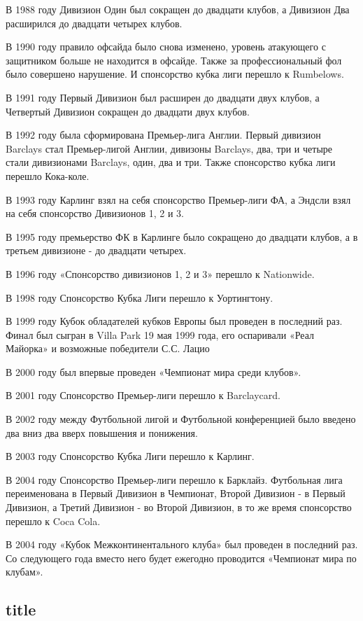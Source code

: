 В 1988 году Дивизион Один был сокращен до двадцати клубов, а Дивизион Два расширился до двадцати четырех клубов.

В 1990 году правило офсайда было снова изменено, уровень атакующего с защитником больше не находится в офсайде. Также за профессиональный фол было совершено нарушение. И спонсорство кубка лиги перешло к Rumbelows.

В 1991 году Первый Дивизион был расширен до двадцати двух клубов, а Четвертый Дивизион сокращен до двадцати двух клубов.

В 1992 году была сформирована Премьер-лига Англии. Первый дивизион Barclays стал Премьер-лигой Англии, дивизоны Barclays, два, три и четыре стали дивизионами Barclays, один, два и три. Также спонсорство кубка лиги перешло Кока-коле.

В 1993 году Карлинг взял на себя спонсорство Премьер-лиги ФА, а Эндсли взял на себя спонсорство Дивизионов 1, 2 и 3.

В 1995 году премьерство ФК в Карлинге было сокращено до двадцати клубов, а в третьем дивизионе - до двадцати четырех.

В 1996 году «Спонсорство дивизионов 1, 2 и 3» перешло к Nationwide.

В 1998 году Спонсорство Кубка Лиги перешло к Уортингтону.

В 1999 году Кубок обладателей кубков Европы был проведен в последний раз. Финал был сыгран в Villa Park 19 мая 1999 года, его оспаривали «Реал Майорка» и возможные победители С.С. Лацио

В 2000 году  был впервые проведен «Чемпионат мира среди клубов».

В 2001 году Спонсорство Премьер-лиги перешло к Barclaycard.

В 2002 году между Футбольной лигой и Футбольной конференцией было введено два вниз два вверх повышения и понижения.

В 2003 году Спонсорство Кубка Лиги перешло к Карлинг.

В 2004 году Спонсорство Премьер-лиги перешло к Барклайз. Футбольная лига переименована в Первый Дивизион в Чемпионат, Второй Дивизион - в Первый Дивизион, а Третий Дивизион - во Второй Дивизион, в то же время спонсорство перешло к Coca Cola.

В 2004 году «Кубок Межконтинентального клуба» был проведен в последний раз. Со следующего года вместо него будет ежегодно проводится «Чемпионат мира по клубам». \cite{fhist}



\subsection{title}